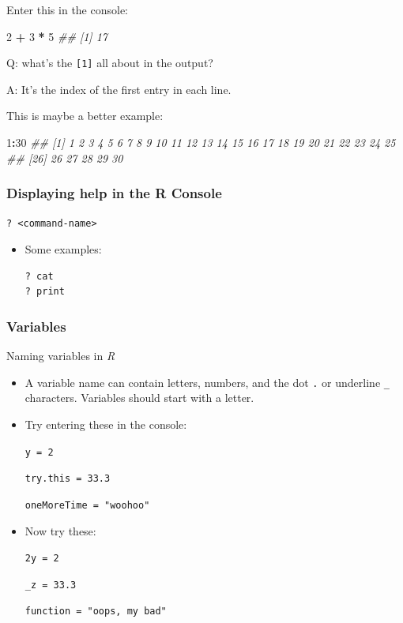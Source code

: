 \documentclass[
]{book}
\newenvironment{Shaded}{\begin{snugshade}}{\end{snugshade}}
\newcommand{\CommentTok}[1]{\textcolor[rgb]{0.56,0.35,0.01}{\textit{#1}}}
\newcommand{\DecValTok}[1]{\textcolor[rgb]{0.00,0.00,0.81}{#1}}
\newcommand{\OperatorTok}[1]{\textcolor[rgb]{0.81,0.36,0.00}{\textbf{#1}}}
\newcommand{\StringTok}[1]{\textcolor[rgb]{0.31,0.60,0.02}{#1}}
\begin{document}
Enter this in the console:

\begin{Shaded}
\begin{Highlighting}[]
\DecValTok{2} \OperatorTok{+}\StringTok{ }\DecValTok{3} \OperatorTok{*}\StringTok{ }\DecValTok{5}
\CommentTok{## [1] 17}
\end{Highlighting}
\end{Shaded}

Q: what's the \texttt{{[}1{]}} all about in the output?

A: It's the index of the first entry in each line.

This is maybe a better example:

\begin{Shaded}
\begin{Highlighting}[]
\DecValTok{1}\OperatorTok{:}\DecValTok{30}
\CommentTok{##  [1]  1  2  3  4  5  6  7  8  9 10 11 12 13 14 15 16 17 18 19 20 21 22 23 24 25}
\CommentTok{## [26] 26 27 28 29 30}
\end{Highlighting}
\end{Shaded}

\hypertarget{displaying-help-in-the-r-console}{%
\subsubsection*{Displaying help in the R Console}\label{displaying-help-in-the-r-console}}

\texttt{?\ \textless{}command-name\textgreater{}}

\begin{itemize}
\item
  Some examples:

\begin{verbatim}
? cat
? print
\end{verbatim}
\end{itemize}

\hypertarget{variables}{%
\subsubsection*{Variables}\label{variables}}

Naming variables in \emph{R}

\begin{itemize}
\item
  A variable name can contain letters, numbers, and the dot \texttt{.} or underline \texttt{\_} characters. Variables should start with a letter.
\item
  Try entering these in the console:

  \texttt{y\ =\ 2}

  \texttt{try.this\ =\ 33.3}

  \texttt{oneMoreTime\ =\ "woohoo"}
\item
  Now try these:

  \texttt{2y\ =\ 2}

  \texttt{\_z\ =\ 33.3}

  \texttt{function\ =\ "oops,\ my\ bad"}
\end{itemize}
\end{document}
